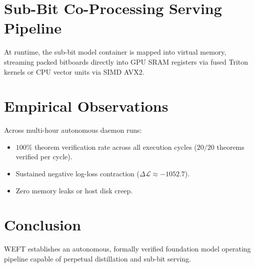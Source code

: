 \documentclass[11pt,a4paper]{article}
\begin{document}
\section{Sub-Bit Co-Processing Serving Pipeline}
At runtime, the sub-bit model container is mapped into virtual memory, streaming packed bitboards directly into GPU SRAM registers via fused Triton kernels or CPU vector units via SIMD AVX2.

\section{Empirical Observations}
Across multi-hour autonomous daemon runs:
\begin{itemize}
    \item $100\%$ theorem verification rate across all execution cycles ($20/20$ theorems verified per cycle).
    \item Sustained negative log-loss contraction ($\Delta \mathcal{L} \approx -1052.7$).
    \item Zero memory leaks or host disk creep.
\end{itemize}

\section{Conclusion}
WEFT establishes an autonomous, formally verified foundation model operating pipeline capable of perpetual distillation and sub-bit serving.
\end{document}
